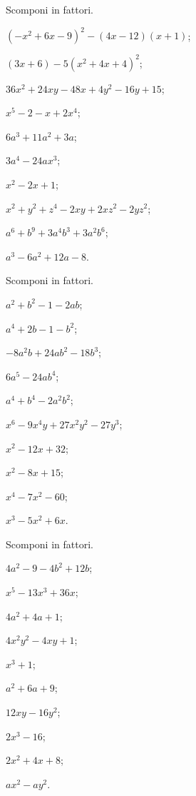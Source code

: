 \begin{esercizio}[\Ast]
 \label{ese:13.98}
 Scomponi in fattori.
\begin{multicols}{2}
 \begin{enumeratea}
\item $(-x^{2}+6x-9)^{2}-(4x-12)(x+1)$;
\item $(3x+6)-5(x^{2}+4x+4)^{2}$;
\item $36x^{2}+24xy-48x+4y^{2}-16y+15$;
\item $x^{5}-2-x+2x^{4}$;
\item $6a^{3}+11a^{2}+3a$;
\item $3a^{4}-24ax^{3}$;
\item $x^{2}-2x+1$;
\item $x^{2}+y^{2}+z^{4}-2xy+2{xz}^{2}-2{yz}^{2}$;
\item $a^{6}+b^{9}+3a^{4}b^{3}+3a^{2}b^{6}$;
\item $a^{3}-6a^{2}+12a-8$.
 \end{enumeratea}
\end{multicols}
\end{esercizio}
\pagebreak
\begin{esercizio}
 \label{ese:13.99}
 Scomponi in fattori.
 \begin{multicols}{2}
 \begin{enumeratea}
 \item $a^{2}+b^{2}-1-2{ab}$;
\item $a^{4}+2b-1-b^{2}$;
\item $-8a^{2}b+24{ab}^{2}-18b^{3}$;
\item $6a^{5}-24{ab}^{4}$;
\item $a^{4}+b^{4}-2a^{2}b^{2}$;
\item $x^{6}-9x^{4}y+27x^{2}y^{2}-27y^{3}$;
\item $x^{2}-12x+32$;
\item $x^{2}-8x+15$;
\item $x^{4}-7x^{2}-60$;
\item $x^{3}-5x^{2}+6x$.
 \end{enumeratea}
 \end{multicols}
\end{esercizio}

\begin{esercizio}
 \label{ese:13.100}
 Scomponi in fattori.
 \begin{multicols}{3}
 \begin{enumeratea}
  \item $4a^{2}-9-4b^{2}+12b$;
\item $x^{5}-13x^{3}+36x$;
\item $4a^{2}+4a+1$;
\item $4x^{2}y^{2}-4xy+1$;
\item $x^{3}+1$;
\item $a^{2}+6a+9$;
\item $12xy-16y^{2}$;
\item $2x^{3}-16$;
\item $2x^{2}+4x+8$;
\item $ax^{2}-{ay}^{2}$.
 \end{enumeratea}
 \end{multicols}
\end{esercizio}

